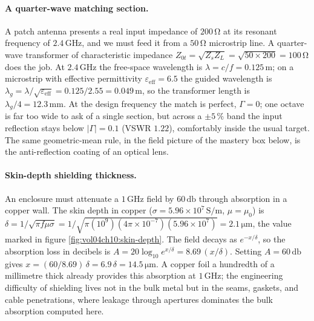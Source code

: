 \paragraph{A quarter-wave matching section.}
A patch antenna presents a real input impedance of $200\,\si{\ohm}$ at its
resonant frequency of $2.4\,\si{\giga\hertz}$, and we must feed it from a
$50\,\si{\ohm}$ microstrip line. A quarter-wave transformer of
characteristic impedance $Z_{0t} = \sqrt{Z_{s}Z_{L}} = \sqrt{50\times 200}
= 100\,\si{\ohm}$ does the job. At $2.4\,\si{\giga\hertz}$ the free-space
wavelength is $\lambda = c/f = 0.125\,\si{\meter}$; on a microstrip with
effective permittivity $\varepsilon_{\text{eff}} = 6.5$ the guided
wavelength is $\lambda_{g} = \lambda/\sqrt{\varepsilon_{\text{eff}}} =
0.125/2.55 = 0.049\,\si{\meter}$, so the transformer length is
$\lambda_{g}/4 = 12.3\,\si{\milli\meter}$. At the design frequency the
match is perfect, $\Gamma = 0$; one octave is far too wide to ask of a
single section, but across a $\pm 5\,\%$ band the input reflection stays
below $|\Gamma| = 0.1$ (VSWR $1.22$), comfortably inside the usual target.
The same geometric-mean rule, in the field picture of the mastery box
below, is the anti-reflection coating of an optical lens.

\paragraph{Skin-depth shielding thickness.}
An enclosure must attenuate a $1\,\si{\giga\hertz}$ field by
$60\,\si{\decibel}$ through absorption in a copper wall. The skin depth in
copper ($\sigma = 5.96\times 10^{7}\,\si{\siemens\per\meter}$, $\mu =
\mu_{0}$) is $\delta = 1/\sqrt{\pi f \mu \sigma} = 1/\sqrt{\pi(10^{9})
(4\pi\times 10^{-7})(5.96\times 10^{7})} = 2.1\,\si{\micro\meter}$, the
value marked in figure \ref{fig:vol04ch10:skin-depth}. The field decays as
$e^{-x/\delta}$, so the absorption loss in decibels is $A = 20\log_{10}
e^{x/\delta} = 8.69\,(x/\delta)$. Setting $A = 60\,\si{\decibel}$ gives
$x = (60/8.69)\,\delta = 6.9\,\delta = 14.5\,\si{\micro\meter}$. A copper
foil a hundredth of a millimetre thick already provides this absorption at
$1\,\si{\giga\hertz}$; the engineering difficulty of shielding lives not in
the bulk metal but in the seams, gaskets, and cable penetrations, where
leakage through apertures dominates the bulk absorption computed here.



